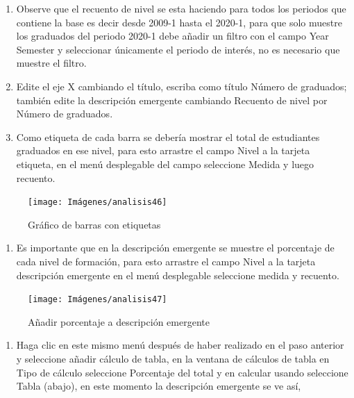 \documentclass[
]{book}
\providecommand{\tightlist}{%
  \setlength{\itemsep}{0pt}\setlength{\parskip}{0pt}}
\begin{document}
\begin{enumerate}
\def\labelenumi{\arabic{enumi}.}
\setcounter{enumi}{7}
\item
  Observe que el recuento de nivel se esta haciendo para todos los periodos que contiene la base es decir desde 2009-1 hasta el 2020-1, para que solo muestre los graduados del periodo 2020-1 debe añadir un filtro con el campo Year Semester y seleccionar únicamente el periodo de interés, no es necesario que muestre el filtro.
\item
  Edite el eje X cambiando el título, escriba como título Número de graduados; también edite la descripción emergente cambiando Recuento de nivel por Número de graduados.
\item
  Como etiqueta de cada barra se debería mostrar el total de estudiantes graduados en ese nivel, para esto arrastre el campo Nivel a la tarjeta etiqueta, en el menú desplegable del campo seleccione Medida y luego recuento.
\end{enumerate}

\begin{figure}

{\centering \texttt{[image: Imágenes/analisis46]} 

}

\caption{Gráfico de barras con etiquetas}\label{fig:paso10graficobarras-fig}
\end{figure}

\begin{enumerate}
\def\labelenumi{\arabic{enumi}.}
\setcounter{enumi}{10}
\tightlist
\item
  Es importante que en la descripción emergente se muestre el porcentaje de cada nivel de formación, para esto arrastre el campo Nivel a la tarjeta descripción emergente en el menú desplegable seleccione medida y recuento.
\end{enumerate}

\begin{figure}

{\centering \texttt{[image: Imágenes/analisis47]} 

}

\caption{Añadir porcentaje a descripción emergente}\label{fig:paso11graficobarras-fig}
\end{figure}

\begin{enumerate}
\def\labelenumi{\arabic{enumi}.}
\setcounter{enumi}{11}
\tightlist
\item
  Haga clic en este mismo menú después de haber realizado en el paso anterior y seleccione añadir cálculo de tabla, en la ventana de cálculos de tabla en Tipo de cálculo seleccione Porcentaje del total y en calcular usando seleccione Tabla (abajo), en este momento la descripción emergente se ve así,
\end{enumerate}
\end{document}
